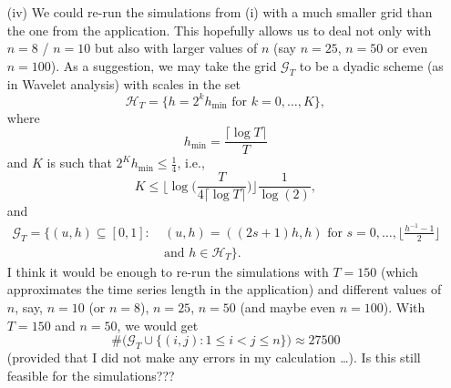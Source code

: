 \documentclass[a4paper,12pt]{article}
\begin{document}
\begin{enumerate}[label=\arabic*.,leftmargin=0.6cm]
{\begin{itemize}[topsep=0pt]
For the comparison, we could consider the design proposed in (i) without covariates and fixed effects (as these are not part of the model in Degras et al.). I'd suggest to add the comparison to the supplement rather than to the main body of the text. 

\item[(iv)] We could re-run the simulations from (i) with a much smaller grid than the one from the application. This hopefully allows us to deal not only with $n=8$ / $n=10$ but also with larger values of $n$ (say $n=25$, $n=50$ or even $n=100$). As a suggestion, we may take the grid $\mathcal{G}_T$ to be a dyadic scheme (as in Wavelet analysis) with scales in the set 
\[ \mathcal{H}_T = \big\{ h = 2^k h_{\min} \text{ for } k=0,\ldots,K \big\}, \]  
where 
\[ h_{\min} = \frac{\lceil \log T \rceil}{T} \]
and $K$ is such that $2^K h_{\min} \le \frac{1}{4}$, i.e.,
\[ K \le \Big\lfloor \log\Big(\frac{T}{4 \lceil \log T \rceil }\Big) \Big\rfloor \frac{1}{\log(2)}, \]
and 
\begin{align*}
\mathcal{G}_T = \big\{ (u,h) \subseteq [0,1]: & \ (u,h) = ((2s+1) h, h) \text{ for } s = 0,\ldots,\Big\lfloor \frac{h^ {-1}-1}{2} \Big\rfloor \\ & \ \text{and } h \in \mathcal{H}_T \big\}.
\end{align*}
I think it would be enough to re-run the simulations with $T=150$ (which approximates the time series length in the application) and different values of $n$, say, $n=10$ (or $n=8$), $n=25$, $n=50$ (and maybe even $n=100$). With $T=150$ and $n=50$, we would get
\[ \# \Big( \mathcal{G}_T \cup \{(i,j): 1 \le i < j \le n \} \Big) \approx 27500 \]
(provided that I did not make any errors in my calculation \dots). Is this still feasible for the simulations???

  
  

\end{itemize}}
\end{enumerate}
\end{document}
